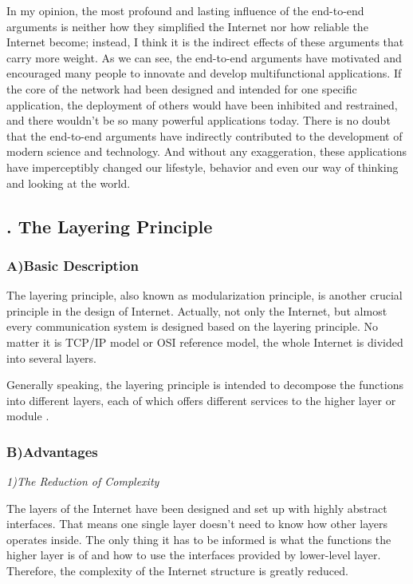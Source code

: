 \documentclass[11pt,twocolumn]{article}
\begin{document}
In my opinion, the most profound and lasting influence of the end-to-end arguments is neither how they simplified the Internet nor how reliable the Internet become; instead, I think it is the indirect effects of these arguments that carry more weight. As we can see, the end-to-end arguments have motivated and encouraged many people to innovate and develop multifunctional applications. If the core of the network had been designed and intended for one specific application, the deployment of others would have been inhibited and restrained, and there wouldn't be so many powerful applications today. There is no doubt that the end-to-end arguments have indirectly contributed to the development of modern science and technology. And without any exaggeration, these applications have imperceptibly changed our lifestyle, behavior and even our way of thinking and looking at the world. 


\subsection*{{}. The Layering Principle}
\subsubsection*{A)\quad Basic Description}
The layering principle, also known as modularization principle, is another crucial principle in the design of Internet. Actually, not only the Internet, but almost every communication system is designed based on the layering principle. No matter it is TCP/IP model or OSI reference model, the whole Internet is divided into several layers.

Generally speaking, the layering principle is intended to decompose the functions into different layers, each of which offers different services to the higher layer or module \cite{DARPA}.

\subsubsection*{B)\quad Advantages}
\emph{1)\quad The Reduction of Complexity}

The layers of the Internet have been designed and set up with highly abstract interfaces. That means one single layer doesn't need to know how other layers operates inside. The only thing it has to be informed is what the functions the higher layer is of and how to use the interfaces provided by lower-level layer. Therefore, the complexity of the Internet structure is greatly reduced.
\end{document}
